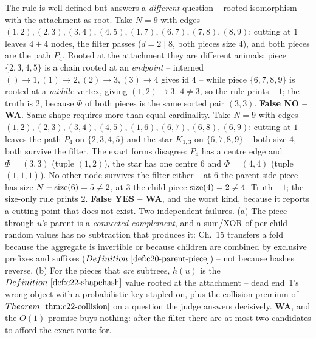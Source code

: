 \begin{thinkbox}
{The rule is well defined but answers a \emph{different} question -- rooted isomorphism with
the attachment as root. Take \(N=9\) with edges
\((1,2),(2,3),(3,4),(4,5),(1,7),(6,7),(7,8),(8,9)\): cutting at \(1\) leaves \(4+4\) nodes,
the filter passes (\(d=2\mid 8\), both pieces size \(4\)), and both pieces are the path
\(P_4\). Rooted at the attachment they are different animals: piece \(\{2,3,4,5\}\) is a
chain rooted at an \emph{endpoint} -- interned \(()\!\to\!1,(1)\!\to\!2,(2)\!\to\!3,(3)\!\to\!4\)
gives id \(4\) -- while piece \(\{6,7,8,9\}\) is rooted at a \emph{middle} vertex, giving
\((1,2)\!\to\!3\). \(4\neq3\), so the rule prints \(-1\); the truth is \(2\), because
\(\Phi\) of both pieces is the same sorted pair \((3,3)\). \textbf{False NO -- WA}.}
{Same shape requires more than equal cardinality. Take \(N=9\) with edges
\((1,2),(2,3),(3,4),(4,5),(1,6),(6,7),(6,8),(6,9)\): cutting at \(1\) leaves the path
\(P_4\) on \(\{2,3,4,5\}\) and the star \(K_{1,3}\) on \(\{6,7,8,9\}\) -- both size \(4\),
both survive the filter. The exact forms disagree: \(P_4\) has a centre edge and
\(\Phi=(3,3)\) (tuple \((1,2)\)), the star has one centre \(6\) and
\(\Phi=(4,4)\) (tuple \((1,1,1)\)). No other node survives the filter either -- at \(6\) the
parent-side piece has size \(N-\operatorname{size}(6)=5\neq 2\), at \(3\) the child piece \(\operatorname{size}(4)=2\neq
4\). Truth \(-1\); the size-only rule prints \(2\). \textbf{False YES -- WA}, and the worst
kind, because it reports a cutting point that does not exist.}
{Two independent failures. (a) The piece through \(u\)'s parent is a \emph{connected
complement}, and a sum/XOR of per-child random values has no subtraction that produces it:
Ch.~15 transfers a fold because the aggregate is invertible or because children are combined
by exclusive prefixes and suffixes (\(\defref{c20-parent-piece}\)) -- not because hashes
reverse. (b) For the pieces that \emph{are} subtrees, \(h(u)\) is the
\(\defref{c22-shapehash}\) value rooted at the attachment -- dead end~1's wrong object with
a probabilistic key stapled on, plus the collision premium of \(\thmref{c22-collision}\) on
a question the judge answers decisively. \textbf{WA}, and the \(O(1)\) promise buys nothing:
after the filter there are at most two candidates to afford the exact route for.}

\end{thinkbox}
